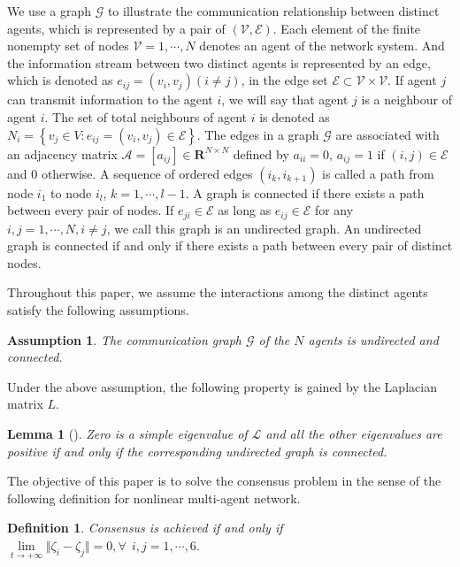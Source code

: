 \documentclass[english]{cccconf}
\newtheorem{assumption}{Assumption}
\newtheorem{lemma}{Lemma}
\newtheorem{definition}{\bf Definition}
\begin{document}
We use a graph $\mathcal{G}$ to illustrate the communication relationship between distinct agents, which is represented by a pair of $(\mathcal V, \mathcal{E})$. Each element of the finite nonempty set of nodes $\mathcal V={1,\cdots, N}$ denotes an agent of the network system. And the information stream between two distinct agents is represented by an edge, which is denoted as $e_{i j} = (v_i, v_j)(i \neq j)$, in the edge set $\mathcal E\subset \mathcal V\times\mathcal V$. If agent $j$ can transmit information to the agent $i$, we will say that agent $j$ is a neighbour of agent $i$. The set of total neighbours of agent $i$ is denoted as $ N_i = \left\{ v_j \in V: e_{i j} = (v_i, v_j) \in \mathcal{E} \right\} $. The edges in a graph $\mathcal G$ are associated with an adjacency matrix $\mathcal A=[a_{i j}]\in\mathbf R^{N\times N}$ defined by $a_{ii}=0$, $a_{i j}=1$ if $(i, j)\in \mathcal E$ and 0 otherwise. A sequence of ordered edges $(i_k, i_{k+1})$ is called a path from node $i_1$ to node $i_l$, $k=1,\cdots, l-1$. A graph is connected if there exists a path between every pair of nodes. If  $e_{j i} \in \mathcal{E}$ as long as  $e_{i j} \in \mathcal{E}$ for any $i, j = 1, \cdots, N, i \neq j$, we call this graph is an undirected graph. An undirected graph is connected if and only if there exists a path between every pair of distinct nodes.

Throughout this paper, we assume the interactions among the distinct agents satisfy the following assumptions.

\begin{assumption}\label{a1}
  The communication graph $\mathcal G$ of the $N$ agents is undirected and connected.
\end{assumption}

Under the above assumption, the following property is gained by the Laplacian matrix $L$.

\begin{lemma}[\cite{Olfati2004Consensus}]\label{undgraph}
  Zero is a simple eigenvalue  of $\mathcal L$ and all the other eigenvalues are positive if and only if the corresponding undirected graph is connected. 
\end{lemma}


The objective of this paper is to solve the consensus problem in the sense of the following definition for nonlinear multi-agent network.


\begin{definition}\label{Consensus}
Consensus is achieved if and only if $\mathop{lim}\limits_{t \to +\infty} \Vert  \zeta_i -  \zeta_j \Vert = 0, \forall ~~i, j=1,\cdots, 6$.
\end{definition}
  
\end{document}
